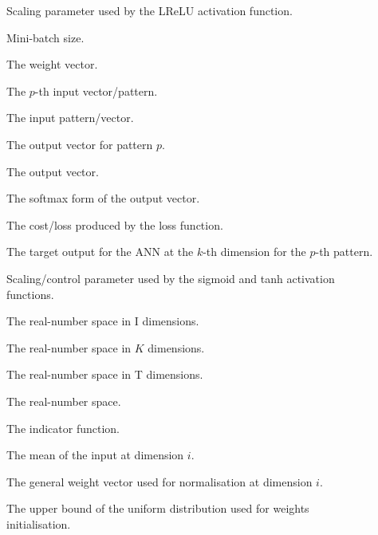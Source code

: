 \begin{description}
	\item [\parbox{2cm}{$\alpha$}] \parbox{12.5cm}{Scaling parameter used by the \acs{LReLU} activation function.}
	\item [\parbox{2cm}{$\beta$}] \parbox{12.5cm}{Mini-batch size.}
	\item [\parbox{2cm}{$\boldsymbol{v}$}] \parbox{12.5cm}{The weight vector.}
	\item [\parbox{2cm}{$\boldsymbol{x}_p$}] \parbox{12.5cm}{The $p$-th input vector/pattern.}
	\item [\parbox{2cm}{$\boldsymbol{x}$}] \parbox{12.5cm}{The input pattern/vector.}
	\item [\parbox{2cm}{$\boldsymbol{y}_{p}$}] \parbox{12.5cm}{The output vector for pattern $p$.}
	\item [\parbox{2cm}{$\boldsymbol{y}$}] \parbox{12.5cm}{The output vector.}
	\item [\parbox{2cm}{$\boldsymbol{y^{'}}$}] \parbox{12.5cm}{The softmax form of the output vector.}
	\item [\parbox{2cm}{$\epsilon$}] \parbox{12.5cm}{The cost/loss produced by the loss function.}
	\item [\parbox{2cm}{$\hat{y}_{k,p}$}] \parbox{12.5cm}{The target output for the \acs{ANN} at the $k$-th dimension for the $p$-th pattern.}
	\item [\parbox{2cm}{$\lambda$}] \parbox{12.5cm}{Scaling/control parameter used by the sigmoid and tanh activation functions.}
	\item [\parbox{2cm}{$\mathbb{R}^{I}$}] \parbox{12.5cm}{The real-number space in I dimensions.}
	\item [\parbox{2cm}{$\mathbb{R}^{K}$}] \parbox{12.5cm}{The real-number space in $K$ dimensions.}
	\item [\parbox{2cm}{$\mathbb{R}^{T}$}] \parbox{12.5cm}{The real-number space in T dimensions.}
	\item [\parbox{2cm}{$\mathbb{R}$}] \parbox{12.5cm}{The real-number space.}
	\item [\parbox{2cm}{$\mathbbm{1}$}] \parbox{12.5cm}{The indicator function.}
	\item [\parbox{2cm}{$\mu_i$}] \parbox{12.5cm}{The mean of the input at dimension $i$.}
	\item [\parbox{2cm}{$\omega_{i}$}] \parbox{12.5cm}{The general weight vector used for normalisation at dimension $i$.}
	\item [\parbox{2cm}{$\omega_{max}$}] \parbox{12.5cm}{The upper bound of the uniform distribution used for weights initialisation.}

\end{description}
